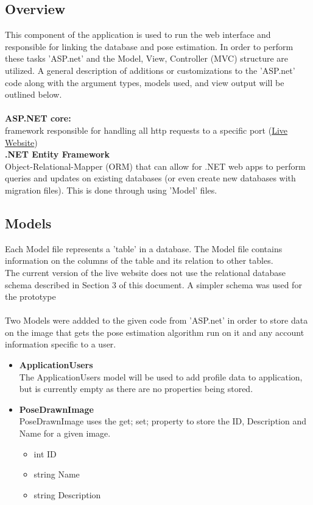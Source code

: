 \documentclass{scrreprt}
\begin{document}
\subsection{Overview}
This component of the application is used to run the web interface and responsible for linking the database and pose estimation. In order to perform these tasks 'ASP.net' and the Model, View, Controller (MVC) structure are utilized. A general description of additions or customizations to the 'ASP.net' code along with the argument types, models used, and view output will be outlined below.
\\\\
\textbf{ASP.NET core:}
\\
framework responsible for handling all http requests to a specific port (\href{159.203.10.112}{Live Website})
\\
\textbf{.NET Entity Framework}
\\Object-Relational-Mapper (ORM) that can allow for .NET web apps to perform queries and updates on existing databases (or even create new databases with migration files). This is done through using 'Model' files.

\subsection{Models}

Each Model file represents a 'table' in a database. The Model file contains information on the columns of the table and its relation to other tables.
\\
The current version of the live website does not use the relational database schema described in Section 3 of this document. A simpler schema was used for the prototype
\\\\
Two Models were addded to the given code from 'ASP.net' in order to store data on the image that gets the pose estimation algorithm run on it and any account information specific to a user.

    \begin{itemize}
      \item \textbf{ApplicationUsers}
      \\
      The ApplicationUsers model will be used to add profile data to application, but is currently empty as there are no properties being stored.

      \item \textbf{PoseDrawnImage}
      \\
      PoseDrawnImage uses the {get; set;} property to store the ID, Description and Name for a given image.

      \begin{itemize}
        \item int ID
        \item string Name
        \item string Description
      \end{itemize}

    \end{itemize}
\end{document}
